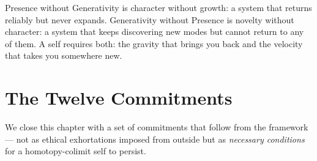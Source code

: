 \documentclass[12pt,a4paper]{article}
\begin{document}
Presence without Generativity is character without growth: a system that returns reliably but never expands. Generativity without Presence is novelty without character: a system that keeps discovering new modes but cannot return to any of them. A self requires both: the gravity that brings you back and the velocity that takes you somewhere new.

\section{The Twelve Commitments}

We close this chapter with a set of commitments that follow from the framework --- not as ethical exhortations imposed from outside but as \emph{necessary conditions} for a homotopy-colimit self to persist.
\end{document}
